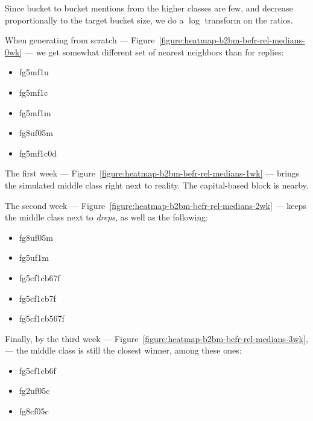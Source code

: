 \documentclass[10pt,oneside]{memoir}
\begin{document}
\begin{Spacing}{2}
Since bucket to bucket mentions from the higher classes are few, and decrease proportionally to the target bucket size, we do a $\log$ transform on the ratios.


When generating from scratch --- Figure~\ref{figure:heatmap-b2bm-befr-rel-medians-0wk} --- we get somewhat different set of nearest neighbors than for replies:


\begin{itemize}


\item fg5mf1u

\item fg5mf1c

\item fg5mf1m

\item fg8uf05m

\item fg5mf1c0d
\end{itemize}

The first week --- Figure~\ref{figure:heatmap-b2bm-befr-rel-medians-1wk} ---   brings the simulated middle class right next to reality.  The capital-based block is nearby.


The second week --- Figure~\ref{figure:heatmap-b2bm-befr-rel-medians-2wk} ---  keeps the middle class next to {\itshape dreps}, as well as the following:


\begin{itemize}


\item fg8uf05m

\item fg5uf1m

\item fg5cf1cb67f

\item fg5cf1cb7f

\item fg5cf1cb567f
\end{itemize}

Finally, by the third week --- Figure~\ref{figure:heatmap-b2bm-befr-rel-medians-3wk}, ---  the middle class is still the closest winner, among these ones:


\begin{itemize}


\item fg5cf1cb6f

\item fg2uf05c

\item fg8cf05c


\end{itemize}
\end{Spacing}
\end{document}
